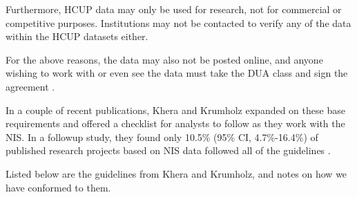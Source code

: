 Furthermore, HCUP data may only be used for research, not for commercial or competitive purposes. Institutions may not be contacted
to verify any of the data within the HCUP datasets either. 

For the above reasons, the data may also not be posted online, and anyone wishing to work with or even see the data must take the DUA class and
sign the agreement \cite{HCUPDUA}.

In a couple of recent publications, Khera and Krumholz expanded on these base requirements and offered a checklist \cite{Krumholz2017} 
for analysts to follow as they work with the NIS. In a followup study, they found only 10.5\% (95\% CI, 4.7\%-16.4\%) of published research
projects based on NIS data followed all of the guidelines \cite{Khera2017}.

Listed below are the guidelines from Khera and Krumholz, and notes on how we have conformed to them.


